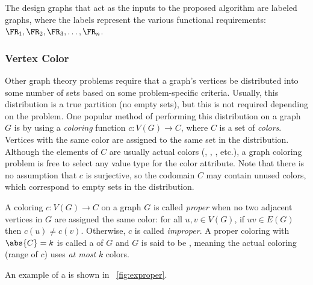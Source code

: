 The design graphs that act as the inputs to the proposed algorithm are labeled graphs, where the labels represent
the various functional requirements: \(\FR_1,\FR_2,\FR_3,\ldots,\FR_n\).

\subsubsection{Vertex Color}\label{sec:sub:sub:color}

Other graph theory problems require that a graph's vertices be distributed into some number of sets based on some
problem-specific criteria.  Usually, this distribution is a true partition (no empty sets), but this is not
required depending on the problem.  One popular method of performing this distribution on a graph \(G\) is by using
a \emph{coloring} function \(c:V(G)\to C\), where \(C\) is a set of \emph{colors}.  Vertices with the same color
are assigned to the same set in the distribution.  Although the elements of \(C\) are usually actual colors
(, , , etc.), a graph coloring problem is free to select any value type for
the color attribute.  Note that there is no assumption that \(c\) is surjective, so the codomain \(C\) may contain
unused colors, which correspond to empty sets in the distribution.

A coloring \(c:V(G)\to C\) on a graph \(G\) is called \emph{proper} when no two adjacent vertices in \(G\) are
assigned the same color: for all \(u,v\in V(G)\), if \(uv\in E(G)\) then \(c(u)\ne c(v)\).  Otherwise, \(c\) is
called \emph{improper}.  A proper coloring with \(\abs{C}=k\) is called a \emph{} of \(G\) and \(G\) is
said to be \emph{}, meaning the actual coloring (range of \(c\)) uses \emph{at most} \(k\) colors.

An example of a  is shown in \figurename~\ref{fig:exproper}.

